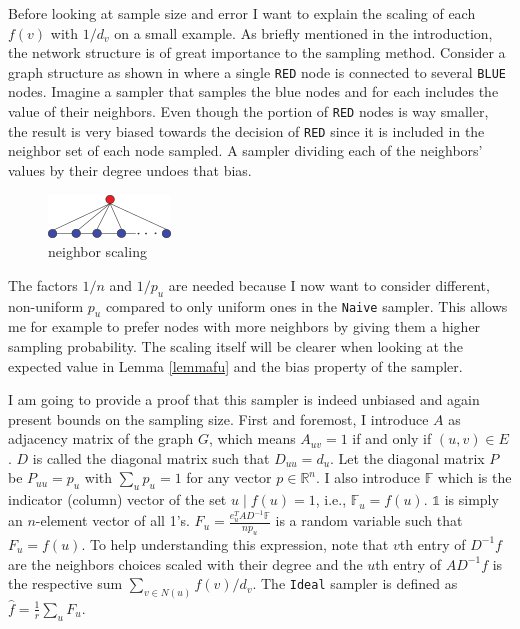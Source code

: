Before looking at sample size and error I want to explain the scaling of each $f(v)$ with $1/d_v$ on a small example.
As briefly mentioned in the introduction, the network structure is of great importance to the sampling method. Consider a graph structure as shown in  where a single \texttt{RED} node is connected to several \texttt{BLUE} nodes.
Imagine a sampler that samples the blue nodes and for each includes the value of their neighbors. Even though the portion of \texttt{RED} nodes is way smaller, the result is very biased towards the decision of \texttt{RED} since it is included in the neighbor set of each node sampled. A sampler dividing each of the neighbors' values by their degree undoes that bias.
\begin{figure}[!ht]
  \begin{center}
    \includegraphics{fig1a}
    \caption{neighbor scaling}
  \end{center}
\end{figure}
The factors $1/n$ and $1/p_u$ are needed because I now want to consider different, non-uniform $p_u$ compared to only uniform ones in the \texttt{Naive} sampler. This allows me for example to prefer nodes with more neighbors by giving them a higher sampling probability. The scaling itself will be clearer when looking at the expected value in Lemma \ref{lemmafu} and the bias property of the sampler.

I am going to provide a proof that this sampler is indeed unbiased and again present bounds on the sampling size.
First and foremost, I introduce $A$ as adjacency matrix of the graph $G$, which means $A_{uv} = 1$ if and only if $(u,v) \in E$. $D$ is called the diagonal matrix such that $D_{uu} = d_u$.
Let the diagonal matrix $P$ be $P_{uu} = p_u$ with $\sum\nolimits_{u}p_u = 1$ for any vector $p \in \mathbb{R}^n$.
I also introduce $\mathds{F}$ which is the indicator (column) vector of the set ${u\;|\;f(u)=1}$, i.e., $\mathds{F}_u=f(u)$.
$\mathds{1}$ is simply an $n$-element vector of all 1's.
$F_u = \frac{e_u^TAD^{-1}\mathds{F}}{np_u}$ is a random variable such that $F_u = f(u)$.
To help understanding this expression, note that $v$th entry of $D^{-1}f$ are the neighbors choices scaled with their degree and the $u$th entry of $AD^{-1}f$ is the respective sum $\sum_{v\in N(u)}f(v)/d_v$.
The \texttt{Ideal} sampler is defined as $\hat{f} = \frac{1}{r}\sum_{u}F_u$.

